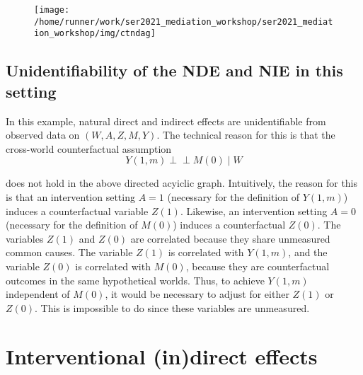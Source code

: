 \documentclass[
  12pt,
]{book}
\theoremstyle{definition}
\theoremstyle{definition}
\theoremstyle{definition}
\newcommand{\indep}{\mbox{$\perp\!\!\!\perp$}}
\newcommand{\1}{\mathbbm{1}}
\begin{document}
\begin{figure}

{\centering \texttt{[image: /home/runner/work/ser2021\_mediation\_workshop/ser2021\_mediation\_workshop/img/ctndag]} 

}

\end{figure}

\hypertarget{unidentifiability-of-the-nde-and-nie-in-this-setting}{%
\subsection{Unidentifiability of the NDE and NIE in this setting}\label{unidentifiability-of-the-nde-and-nie-in-this-setting}}

In this example, natural direct and indirect effects are
unidentifiable from observed data on \((W,A,Z,M,Y)\). The technical
reason for this is that the cross-world counterfactual assumption
\begin{equation*}
  Y(1,m)\indep M(0)\mid W
\end{equation*}

does not hold in the above directed acyiclic graph. Intuitively, the
reason for this is that an intervention setting \(A=1\) (necessary for
the definition of \(Y(1,m)\)) induces a counterfactual variable
\(Z(1)\). Likewise, an intervention setting \(A=0\) (necessary for the
definition of \(M(0)\)) induces a counterfactual \(Z(0)\). The variables
\(Z(1)\) and \(Z(0)\) are correlated because they share unmeasured common
causes. The variable \(Z(1)\) is correlated with \(Y(1,m)\), and the
variable \(Z(0)\) is correlated with \(M(0)\), because they are
counterfactual outcomes in the same hypothetical worlds. Thus, to
achieve \(Y(1,m)\) independent of \(M(0)\), it would be necessary to
adjust for either \(Z(1)\) or \(Z(0)\). This is impossible to do since
these variables are unmeasured.

\hypertarget{interventional-indirect-effects}{%
\section{Interventional (in)direct effects}\label{interventional-indirect-effects}}
\end{document}
